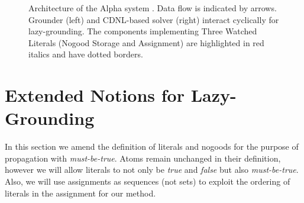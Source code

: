 \documentclass{vutinfth} %
\newtheorem{definition}{Definition}[chapter]
\newcommand{\mbt}{must-be-true\xspace}
\begin{document}
\begin{figure}[t]
\caption[Architecture of the Alpha system]{Architecture of the Alpha system \cite[Figure 1]{alpha-techniques}. Data flow is indicated by arrows. Grounder (left) and CDNL-based solver (right) interact cyclically for lazy-grounding. The components implementing Three Watched Literals (Nogood Storage and Assignment) are highlighted in red italics and have dotted borders.}
  \label{fig:arch}
\end{figure}

\section{Extended Notions for Lazy-Grounding}


In this section we amend the definition of literals and nogoods for the purpose of propagation with \emph{\mbt}. Atoms remain unchanged in their definition, however we will allow literals to not only be \emph{true} and \emph{false} but also \emph{\mbt}. Also, we will use assignments as sequences (not sets) to exploit the ordering of literals in the assignment for our method.



\end{document}
